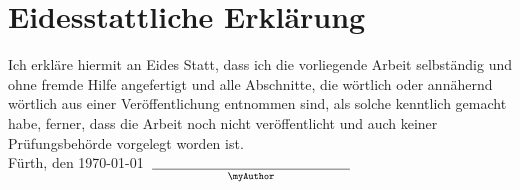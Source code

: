 


\section*{Eidesstattliche Erklärung}

 Ich erkläre hiermit an Eides Statt, dass ich die vorliegende Arbeit selbständig und ohne fremde Hilfe angefertigt und alle Abschnitte, die wörtlich oder annähernd wörtlich aus einer Veröffentlichung entnommen sind, als solche kenntlich gemacht habe, ferner, dass die Arbeit noch nicht veröffentlicht und auch keiner Prüfungsbehörde vorgelegt worden ist.\\[4cm]

\noindent
Fürth, den \today~$\underset{\text{\myAuthor}}{\underline{\hspace{5cm}}}$
